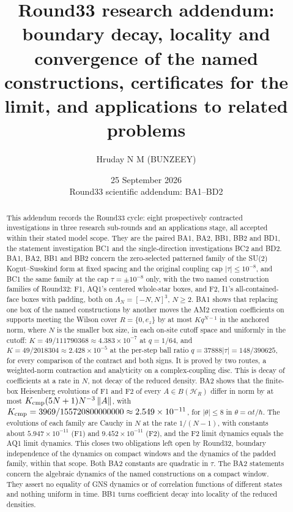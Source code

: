 \documentclass[11pt,a4paper]{article}
\title{Round33 research addendum: boundary decay, locality and convergence of
the named constructions, certificates for the limit, and applications to
related problems}
\author{Hruday N M (BUNZEEY)}
\date{25 September 2026\\\small Round33 scientific addendum: BA1--BD2}
\begin{document}
\maketitle
\begin{abstract}
This addendum records the Round33 cycle: eight prospectively contracted
investigations in three research sub-rounds and an applications stage, all
accepted within their stated model scope. They are the paired BA1, BA2, BB1,
BB2 and BD1, the statement investigation BC1 and the single-direction
investigations BC2 and BD2. BA1, BA2, BB1 and BB2
concern the zero-selected patterned family of the SU(2)
Kogut--Susskind form at fixed spacing and the original coupling cap
$|\tau|\le10^{-8}$, and BC1 the same family at the cap $\tau=\pm10^{-8}$
only, with the two named construction families of Round32:
F1, AQ1's centered whole-star boxes, and F2, I1's all-contained-face boxes
with padding, both on $\Lambda_N=[-N,N]^3$, $N\ge2$. BA1 shows that
replacing one box of the named constructions by another moves the AM2
creation coefficients on supports meeting the Wilson cover $R=\{0,e_z\}$ by at
most $Kq^{N-1}$ in the anchored norm, where $N$ is the smaller box size, in
each on-site cutoff space and uniformly in the cutoff: $K=49/111790368\approx
4.383\times10^{-7}$ at $q=1/64$, and $K=49/2018304\approx2.428\times10^{-5}$
at the per-step ball ratio $q=37888|\tau|=148/390625$, for every comparison of
the contract and both signs. It is proved by two routes, a weighted-norm
contraction and analyticity on a complex-coupling disc. This is decay of coefficients
at a rate in $N$, not decay of the reduced density. BA2 shows that the
finite-box Heisenberg evolutions of F1 and F2 of every $A\in B(\mathcal H_R)$
differ in norm by at most $K_{\rm cmp}(5N+1)N^{-3}\left\lVert A\right\rVert$, with
$K_{\rm cmp}=3969/155720800000000\approx2.549\times10^{-11}$, for
$|\theta|\le8$ in $\theta=\alpha t/\hbar$. The evolutions of each family are
Cauchy in $N$ at the rate $1/(N-1)$, with constants about
$5.947\times10^{-11}$ (F1) and $9.452\times10^{-11}$ (F2), and the F2 limit
dynamics equals the AQ1 limit dynamics. This closes two obligations left
open by Round32, boundary independence of the dynamics on compact windows and
the dynamics of the padded family, within that scope. Both BA2 constants are
quadratic in $\tau$. The BA2 statements concern the algebraic dynamics of the
named constructions on a compact window. They assert no equality of GNS
dynamics or of correlation functions of different states and nothing uniform
in time. BB1 turns coefficient decay into locality of the reduced densities.

\end{abstract}
\end{document}
